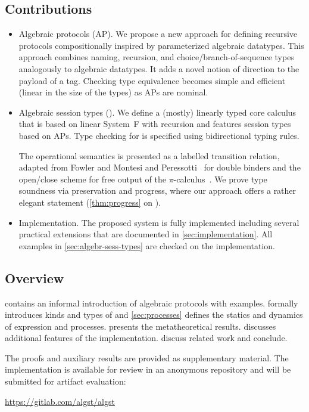 \subsection*{Contributions}
\label{sec:contributions}

\begin{itemize}
\item Algebraic protocols (AP). We propose a new approach for defining
  recursive protocols compositionally inspired by parameterized algebraic
  datatypes. This approach combines naming, recursion, and
  choice/branch-of-sequence types analogously to algebraic
  datatypes. It adds a novel notion of direction to the payload of a
  tag. Checking type equivalence becomes simple and efficient
  (linear in the size of the types) as APs are nominal. 
\item Algebraic session types (\algst). We define a (mostly) linearly typed core calculus that
  is based on linear System~F with recursion and features session
  types based on APs. Type checking for \algst is specified  using bidirectional
  typing rules. 

  The operational semantics is presented as a labelled transition relation, adapted
  from Fowler \etal and Montesi and
  Peressotti~\cite{DBLP:conf/concur/0001KDLM21,DBLP:journals/corr/abs-2105-08996,DBLP:journals/corr/abs-2106-11818}
  for double binders and the open/close scheme for free output of the
  $\pi$-calculus~\cite{DBLP:journals/iandc/MilnerPW92b}.
  We prove type soundness via preservation and progress, where our approach offers a
  rather elegant statement (\cref{thm:progress} on ). 
\item Implementation. The proposed system is fully implemented
  including several practical extensions that are documented in
  \cref{sec:implementation}. All examples in
  \cref{sec:algebr-sess-types} are checked on the implementation.
\end{itemize}

\subsection*{Overview}
\label{sec:overview}

 contains an informal introduction of
algebraic protocols with examples.  formally
introduces kinds and types of \algst and \cref{sec:processes} defines
the statics and dynamics of expression and
processes.  presents the metatheoretical
results.
 discusses additional features of the
implementation.  discuss related
work and conclude.

The proofs and auxiliary results are provided as supplementary material. 
The implementation is available for review in an anonymous repository
and will be submitted for artifact evaluation:
\begin{center}
  \url{https://gitlab.com/algst/algst}
\end{center}

